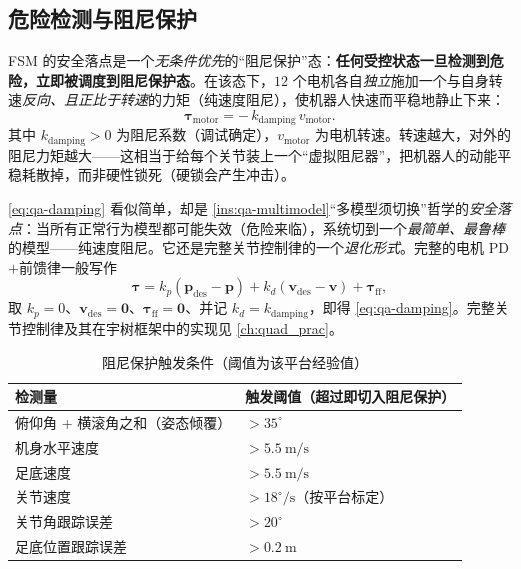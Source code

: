 \subsection{危险检测与阻尼保护}
\label{subsec:qa-fsm-safe}

FSM 的安全落点是一个\emph{无条件优先}的“阻尼保护”态：\textbf{任何受控状态一旦检测到危险，立即被调度到阻尼保护态}\cite{yu2021quadruped}。在该态下，$12$ 个电机各自\emph{独立}施加一个与自身转速\emph{反向、且正比于转速}的力矩（纯速度阻尼），使机器人快速而平稳地静止下来：
\begin{equation}
  \boldsymbol\tau_{\mathrm{motor}}=-\,k_{\mathrm{damping}}\,v_{\mathrm{motor}}.
  \label{eq:qa-damping}
\end{equation}
其中 $k_{\mathrm{damping}}>0$ 为阻尼系数（调试确定），$v_{\mathrm{motor}}$ 为电机转速。转速越大，对外的阻尼力矩越大——这相当于给每个关节装上一个“虚拟阻尼器”，把机器人的动能平稳耗散掉，而非硬性锁死（硬锁会产生冲击）\cite{yu2021quadruped}。

\begin{insight}\label{ins:qa-damping-degenerate}
\cref{eq:qa-damping} 看似简单，却是 \cref{ins:qa-multimodel}“多模型须切换”哲学的\emph{安全落点}：当所有正常行为模型都可能失效（危险来临），系统切到一个\emph{最简单、最鲁棒}的模型——纯速度阻尼。它还是完整关节控制律的一个\emph{退化形式}。完整的电机 PD$+$前馈律一般写作
\[
  \boldsymbol\tau=k_p(\boldsymbol p_{\mathrm{des}}-\boldsymbol p)+k_d(\boldsymbol v_{\mathrm{des}}-\boldsymbol v)+\boldsymbol\tau_{\mathrm{ff}},
\]
取 $k_p=0$、$\boldsymbol v_{\mathrm{des}}=\mathbf{0}$、$\boldsymbol\tau_{\mathrm{ff}}=\mathbf{0}$、并记 $k_d=k_{\mathrm{damping}}$，即得 \cref{eq:qa-damping}。完整关节控制律及其在宇树框架中的实现见 \cref{ch:quad_prac}。
\end{insight}

\begin{table}[H]\centering\small
\caption{阻尼保护触发条件\cite{yu2021quadruped}（阈值为该平台经验值）}
\begin{tabular}{ll}
\toprule
检测量 & 触发阈值（超过即切入阻尼保护） \\
\midrule
俯仰角 + 横滚角之和（姿态倾覆） & $>35^\circ$ \\
机身水平速度 & $>5.5\ \text{m/s}$ \\
足底速度 & $>5.5\ \text{m/s}$ \\
关节速度 & $>18^\circ/\text{s}$（按平台标定） \\
关节角跟踪误差 & $>20^\circ$ \\
足底位置跟踪误差 & $>0.2\ \text{m}$ \\
\bottomrule
\end{tabular}
\label{tab:qa-danger}
\end{table}

